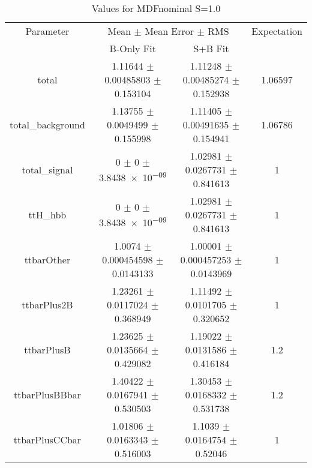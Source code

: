 \begin{table}
\centering
\caption{Values for MDFnominal S=1.0}
\begin{tabular}{cccc}
\toprule
Parameter & \multicolumn{2}{c}{Mean $\pm$ Mean Error $\pm$ RMS} & Expectation\\
 & B-Only Fit & S+B Fit & \\
\midrule
total & \num{1.11644} $\pm$ \num{0.00485803} $\pm$ \num{0.153104} & \num{1.11248} $\pm$ \num{0.00485274} $\pm$ \num{0.152938} & \num{1.06597}\\
total\_background & \num{1.13755} $\pm$ \num{0.0049499} $\pm$ \num{0.155998} & \num{1.11405} $\pm$ \num{0.00491635} $\pm$ \num{0.154941} & \num{1.06786}\\
total\_signal & \num{0} $\pm$ \num{0} $\pm$ \num{3.8438e-09} & \num{1.02981} $\pm$ \num{0.0267731} $\pm$ \num{0.841613} & \num{1}\\
ttH\_hbb & \num{0} $\pm$ \num{0} $\pm$ \num{3.8438e-09} & \num{1.02981} $\pm$ \num{0.0267731} $\pm$ \num{0.841613} & \num{1}\\
ttbarOther & \num{1.0074} $\pm$ \num{0.000454598} $\pm$ \num{0.0143133} & \num{1.00001} $\pm$ \num{0.000457253} $\pm$ \num{0.0143969} & \num{1}\\
ttbarPlus2B & \num{1.23261} $\pm$ \num{0.0117024} $\pm$ \num{0.368949} & \num{1.11492} $\pm$ \num{0.0101705} $\pm$ \num{0.320652} & \num{1}\\
ttbarPlusB & \num{1.23625} $\pm$ \num{0.0135664} $\pm$ \num{0.429082} & \num{1.19022} $\pm$ \num{0.0131586} $\pm$ \num{0.416184} & \num{1.2}\\
ttbarPlusBBbar & \num{1.40422} $\pm$ \num{0.0167941} $\pm$ \num{0.530503} & \num{1.30453} $\pm$ \num{0.0168332} $\pm$ \num{0.531738} & \num{1.2}\\
ttbarPlusCCbar & \num{1.01806} $\pm$ \num{0.0163343} $\pm$ \num{0.516003} & \num{1.1039} $\pm$ \num{0.0164754} $\pm$ \num{0.52046} & \num{1}\\
\bottomrule
\end{tabular}
\end{table}